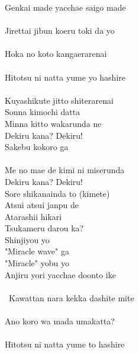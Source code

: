 \def\songtitle{MIRACLE WAVE}
\def\songcomment{Season 2 Insert Song}
\def\songlyrics{Aki Hata}
\def\songwriter{Takuya Sakai}
\def\songarrange{Masatomi Waki}
   
\ifdefined\COMPLETE
\else
	
	
\fi
\thispagestyle{song}

\begin{multicols}{2}
Genkai made yacchae saigo made\\
\\
Jirettai jibun koeru toki da yo\\
\\
Hoka no koto kangaerarenai\\
\\
Hitotsu ni natta yume yo hashire\\
\\

Kuyashikute jitto shiterarenai\\
Sonna kimochi datta\\
Minna kitto wakarunda ne\\

Dekiru kana?  Dekiru! \\
Sakebu kokoro ga\\
\\
Me no mae de kimi ni miserunda\\
Dekiru kana?  Dekiru! \\
Sore shikanainda to (kimete)\\
Atsui atsui janpu de\\
Atarashii hikari\\
Tsukameru darou ka?\\
Shinjiyou yo \\
"Miracle wave" ga\\
"Miracle" yobu yo\\

Anjiru yori yacchae doonto ike\\
\\\
Kawattan nara kekka dashite mite\\
\\
Ano koro wa mada umakatta?\\
\\
Hitotsu ni natta yume to hashire\\
\columnbreak


\end{multicols}
